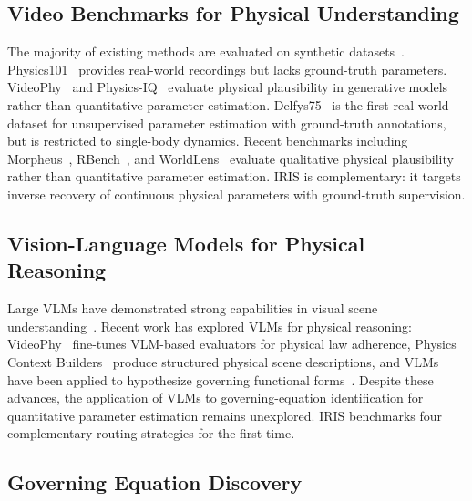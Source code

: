 \documentclass[runningheads]{llncs}
\begin{document}
\subsection{Video Benchmarks for Physical Understanding}
\label{sec:related_benchmarks}

The majority of existing methods are evaluated on synthetic datasets~\cite{de2018end, jaques2019physics, velivckovic2022reasoning, watters2017visual, yang2022learning, zheng2018unsupervised}. Physics101~\cite{wu2016physics} provides real-world recordings but lacks ground-truth parameters. VideoPhy~\cite{bansal2024videophy} and Physics-IQ~\cite{motamed2026generative} evaluate physical plausibility in generative models rather than quantitative parameter estimation. Delfys75~\cite{garcia2025learning} is the first real-world dataset for unsupervised parameter estimation with ground-truth annotations, but is restricted to single-body dynamics. Recent benchmarks including Morpheus~\cite{zhang2025morpheus}, RBench~\cite{guo2025rbench}, and WorldLens~\cite{liang2025worldlens} evaluate qualitative physical plausibility rather than quantitative parameter estimation. IRIS is complementary: it targets inverse recovery of continuous physical parameters with ground-truth supervision.


\subsection{Vision-Language Models for Physical Reasoning}
\label{sec:related_vlm}

Large VLMs have demonstrated strong capabilities in visual scene understanding~\cite{roumeliotis2023chatgpt, liu2023visual, zhang2024llava}. Recent work has explored VLMs for physical reasoning: VideoPhy~\cite{bansal2024videophy} fine-tunes VLM-based evaluators for physical law adherence, Physics Context Builders~\cite{balazadeh2025physics} produce structured physical scene descriptions, and VLMs have been applied to hypothesize governing functional forms~\cite{liu2025mimicking}. Despite these advances, the application of VLMs to governing-equation identification for quantitative parameter estimation remains unexplored. IRIS benchmarks four complementary routing strategies for the first time.

\subsection{Governing Equation Discovery}
\label{sec:related_eq_discovery}
\end{document}
